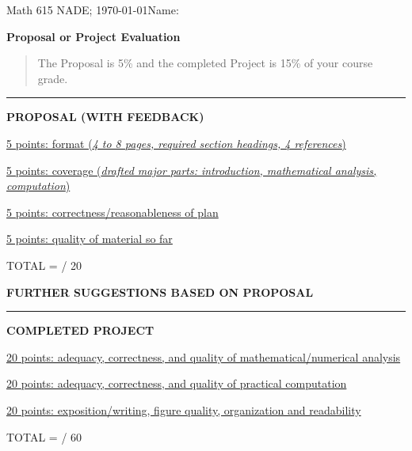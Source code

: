 \documentclass[11pt]{amsart}
\newcommand{\normalspacing}{\renewcommand{\baselinestretch}{1.05}
        \tiny\normalsize}
\begin{document}
\scriptsize
\noindent Math 615 NADE; \today \hfill \Large Name:\underline{\phantom{DLFJD SFLKJSD sdfa}}

\thispagestyle{empty}
\bigskip

\Large\centerline{\textbf{Proposal or Project Evaluation}}
\normalsize\normalspacing

\bigskip

\begin{quote}
The Proposal is 5\% and the completed Project is 15\% of your course grade.
\end{quote}

\noindent\rule{\textwidth}{0.7mm}
\bigskip

\large\centerline{\textbf{PROPOSAL (WITH FEEDBACK)}}
\bigskip

\noindent \underline{5 points: format (\emph{4 to 8 pages, required section headings, 4 references})}
\vfill

\noindent \underline{5 points: coverage (\emph{drafted major parts: introduction, mathematical analysis, computation})}
\vfill

\noindent \underline{5 points: correctness/reasonableness of plan}
\vfill

\noindent \underline{5 points: quality of material so far}
\vfill

\hfill TOTAL = \phantom{foo bar} / 20

\newpage


\large\centerline{\textbf{FURTHER SUGGESTIONS BASED ON PROPOSAL}}
\bigskip

\vspace{3.0in}

\noindent\rule{\textwidth}{0.7mm}
\bigskip

\large\centerline{\textbf{COMPLETED PROJECT}}
\bigskip

\noindent \underline{20 points: adequacy, correctness, and quality of mathematical/numerical analysis}
\vfill

\noindent \underline{20 points: adequacy, correctness, and quality of practical computation}
\vfill

\noindent \underline{20 points: exposition/writing, figure quality, organization and readability}
\vfill

\hfill TOTAL = \phantom{foo bar} / 60
\end{document}
